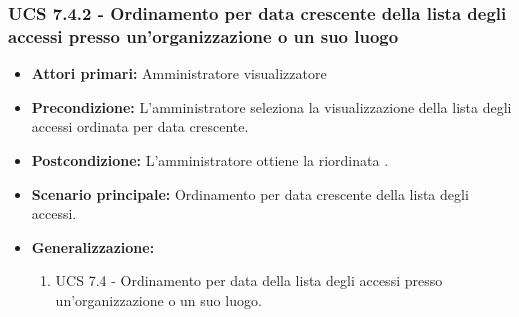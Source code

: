 \subsubsection{UCS 7.4.2 - Ordinamento per data crescente della lista degli accessi presso un'organizzazione o un suo luogo}
\begin{itemize}
    \item \textbf{Attori primari:} Amministratore visualizzatore
    \item \textbf{Precondizione:} L'amministratore seleziona la visualizzazione della lista degli accessi ordinata per data crescente.
    \item \textbf{Postcondizione:} L'amministratore ottiene la  riordinata .
    \item \textbf{Scenario principale:} Ordinamento per data crescente della lista degli accessi.
    \item \textbf{Generalizzazione:}
	\begin{enumerate}
		\item UCS 7.4 - Ordinamento per data della lista degli accessi presso un'organizzazione o un suo luogo.
	\end{enumerate}
\end{itemize}